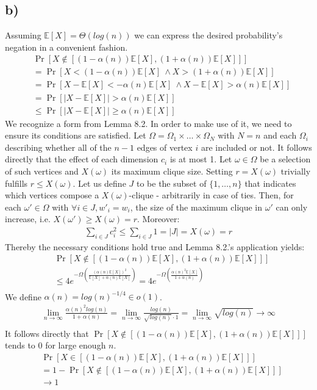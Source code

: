 \documentclass[a4paper,german]{article}
\newcommand{\E}{\mathbb{E}}
\begin{document}
\subsection*{b)}
Assuming \(\E[X] = \Theta(log(n))\) we can express the desired probability's negation in a convenient fashion.
\begin{align*}
&\Pr[X \notin  [(1 - \alpha(n)) \E[X], (1 + \alpha(n)) \E[X]]] \\
&= \Pr[X < (1 - \alpha(n)) \E[X]\ \wedge  X > (1 + \alpha(n)) \E[X]] \\
&= \Pr[X - \E[X] < - \alpha(n) \E[X]\ \wedge X - \E[X] > \alpha(n) \E[X]] \\
&= \Pr[|X - \E[X]| > \alpha(n)\E[X]] \\
& \leq \Pr[|X - \E[X]| \geq \alpha(n)\E[X]]
\end{align*}
We recognize a form from Lemma 8.2. In order to make use of it, we need to ensure its conditions are satisfied. Let \( \Omega = \Omega_1 \times \dots \times \Omega_N\) with \(N = n\) and each \(\Omega_i\) describing whether all of the \(n-1\) edges of vertex \(i\) are included or not. It follows directly that the effect of each dimension \(c_i\) is at most 1. Let \(\omega \in \Omega\) be a selection of such vertices and \(X(\omega)\) its maximum clique size. Setting \(r = X(\omega)\) trivially fulfills \(r \leq X(\omega)\). Let us define \(J\) to be the subset of \(\{1, \dots, n\}\) that indicates which vertices compose a \(X(\omega)\)-clique - arbitrarily in case of ties. Then, for each \(\omega' \in \Omega\) with \(\forall i \in J, w'_i = w_i\), the size of the maximum clique in \(\omega'\) can only increase, i.e. \(X(\omega') \geq X(\omega) = r\). Moreover:
\begin{align*}
 \sum_{i \in J} c_i^2 \leq \sum_{i \in J} 1 = |J| = X(\omega) = r
 \end{align*}
Thereby the necessary conditions hold true and Lemma 8.2.'s application yields:
\begin{align*}
&\Pr[X \notin  [(1 - \alpha(n)) \E[X], (1 + \alpha(n)) \E[X]]] \\
&\leq 4 e^{- \Omega(\frac{(\alpha(n)\E[X])^2}{\E[X] + \alpha(n) \E[X]})} =  4 e^{- \Omega(\frac{\alpha(n)^2\E[X]}{1 + \alpha(n)})}\\
\end{align*}
We define \(\alpha(n) = log(n) ^ {-1/4} \in o(1)\). 
\begin{align*}
\lim_{n \to \infty} \frac{\alpha(n)^2 log(n)}{1 + \alpha(n)} = \lim_{n \to \infty} \frac{log(n)}{\sqrt{log(n)} \cdot 1} = \lim_{n \to \infty} \sqrt{log(n)} \to \infty\\
\end{align*}
It follows directly that \(\Pr[X \notin  [(1 - \alpha(n)) \E[X], (1 + \alpha(n)) \E[X]]] \) tends to 0 for large enough \(n\).
\begin{align*}
&\Pr[X \in  [(1 - \alpha(n)) \E[X], (1 + \alpha(n)) \E[X]]]  \\
&= 1 - \Pr[X \notin  [(1 - \alpha(n)) \E[X], (1 + \alpha(n)) \E[X]]] \\
& \to 1
\end{align*}
\end{document}
